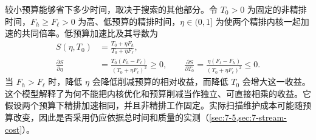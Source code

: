 较小预算能够省下多少时间，取决于搜索的其他部分。令 $T_0>0$ 为固定的非精排时间，$F_h\geq F_\ell>0$ 为高、低预算的精排时间，$\eta\in(0,1]$ 为使两个精排内核一起加速的共同倍率。低预算加速比及其导数为
\begin{align}
 S(\eta,T_0)&=\frac{T_0+\eta F_h}{T_0+\eta F_\ell},
 \label{eq:8-refinement-sensitivity}\\
 \frac{\partial S}{\partial\eta}
 &=\frac{T_0(F_h-F_\ell)}{(T_0+\eta F_\ell)^2}\geq0,\qquad
 \frac{\partial S}{\partial T_0}
 =\frac{\eta(F_\ell-F_h)}{(T_0+\eta F_\ell)^2}\leq0.\nonumber
\end{align}
当 $F_h>F_\ell$ 时，降低 $\eta$ 会降低削减预算的相对收益，而降低 $T_0$ 会增大这一收益。这个模型解释了为何不能把内核优化和预算削减当作独立、可直接相乘的收益。它假设两个预算下精排加速相同，并且非精排工作固定。实际扫描维护成本可能随预算改变，因此是否采用仍应依据总时间和质量的实测（\cref{sec:7-5,sec:7-stream-cost}）。
